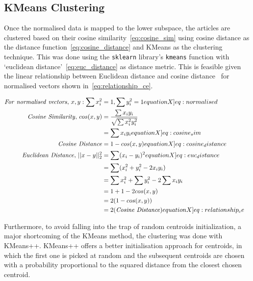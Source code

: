 \subsection{KMeans Clustering}
Once the normalised data is mapped to the lower subspace, the articles are clustered based on their cosine similarity~\cref{eq:cosine_sim} using cosine distance as the distance function~\cref{eq:cosine_distance} and KMeans as the clustering technique. This was done using the \texttt{sklearn} library's \texttt{kmeans} function with `euclidean distance'~\cref{eq:euc_distance} as distance metric. This is feasible given the linear relationship between Euclidean distance and  cosine distance~\cite{kmeans} for normalised vectors shown in~\cref{eq:relationship_ce}.

\begin{align}
  \mathit{For \ normalised \ vectors,} \ x, y:  \sum x_i^2 &= 1,  \sum y_i^2 = 1 \label[equationX]{eq:normalised} &\\ 
  \mathit{Cosine \ Similarity,} \ cos(x, y) &= \frac{\sum x_i y_i}{\sqrt{\sum x_i^2 y_i^2}}  \nonumber &\\ 
   &= \sum x_i y_i \label[equationX]{eq:cosine_sim} &\\
   \mathit{Cosine \ Distance} &= 1 - cos(x, y) \label[equationX]{eq:cosine_distance} &\\
   \mathit{Euclidean \ Distance,} \ || x - y ||_2^2  &= \sum (x_i -  y_i)^2  \label[equationX]{eq:euc_distance} &\\
                 &= \sum (x_i^2 + y_i^2 - 2 x_i y_i)  \nonumber &\\
                 &= \sum x_i^2 + \sum y_i^2 - 2\sum x_i y_i   \nonumber &\\
                 &= 1 + 1 - 2 cos(x, y)  \nonumber &\\
                 &= 2 (1 - cos(x, y))  &\\
                 &= 2 (\mathit{Cosine \ Distance}) \label[equationX]{eq:relationship_ce}
\end{align}



Furthermore, to avoid falling into the trap of random centroids initialization, a major shortcoming of the KMeans method, the clustering was done with KMeans++. KMeans++ offers a better initialisation approach for centroids, in which the first one is picked at random and the subsequent centroids are chosen with a probability proportional to the squared distance from the closest chosen centroid.


